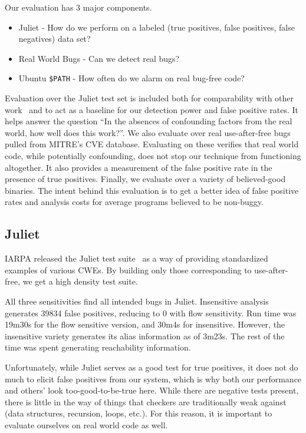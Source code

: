 \label{alias:sec:eval}
Our evaluation has 3 major components.
\begin{itemize}
\item Juliet - How do we perform on a labeled (true positives, false positives, false negatives) data set?
\item Real World Bugs - Can we detect real bugs? 
\item Ubuntu \texttt{\$PATH} - How often do we alarm on real bug-free code?
\end{itemize}

Evaluation over the Juliet test set is included both for comparability with other work~\cite{tac, juliet-eval-static-source} and to act as a baseline for our detection power and false positive rates.
It helps answer the question ``In the absences of confounding factors from the real world, how well does this work?''.
We also evaluate over real use-after-free bugs pulled from MITRE's CVE database.
Evaluating on these verifies that real world code, while potentially confounding, does not stop our technique from functioning altogether.
It also provides a measurement of the false positive rate in the presence of true positives.
Finally, we evaluate over a variety of believed-good binaries.
The intent behind this evaluation is to get a better idea of false positive rates and analysis costs for average programs believed to be non-buggy.

\subsection{Juliet}
IARPA released the Juliet test suite~\cite{juliet} as a way of providing standardized examples of various CWEs.
By building only those corresponding to use-after-free, we get a high density test suite.

All three sensitivities find all intended bugs in Juliet.
Insensitive analysis generates 39834 false positives, reducing to 0 with flow sensitivity.
Run time was 19m30s for the flow sensitive version, and 30m4s for insensitive.
However, the insensitive variety generates its alias information as of 3m23s.
The rest of the time was spent generating reachability information.

Unfortunately, while Juliet serves as a good test for true positives, it does not do much to elicit false positives from our system, which is why both our performance and others' look too-good-to-be-true here.
While there are negative tests present, there is little in the way of things that checkers are traditionally weak against (data structures, recursion, loops, etc.).
For this reason, it is important to evaluate ourselves on real world code as well.

